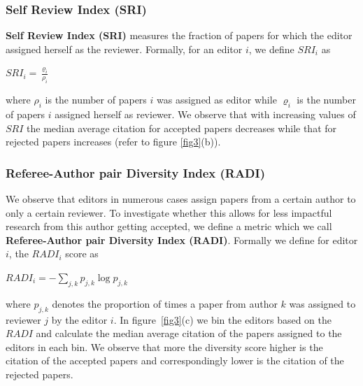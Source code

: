 \subsubsection{Self Review Index (SRI)}

{\bf Self Review Index (SRI)} measures the fraction of papers for which the editor assigned herself as the reviewer. 
Formally, for an editor $i$, we define $SRI_{i}$ as 
\begin{center}
$SRI_{i}=\frac{\varrho_{i}}{\rho_{i}}$
\end{center}
where $\rho_{i}$ is the number of papers $i$ was assigned as editor while $\varrho_{i}$ is the number of papers $i$ assigned herself as reviewer. We observe that with increasing values of $SRI$ the median average citation for accepted papers decreases while that for rejected papers increases (refer to figure \ref{fig3}(b)). 

\subsubsection{Referee-Author pair Diversity Index (RADI)}

We observe that editors in numerous cases assign papers from a certain author to only a certain reviewer. To investigate whether this allows for less impactful research from this author getting accepted, we define a metric which we call {\bf Referee-Author pair Diversity Index (RADI)}. Formally we define for editor $i$, the $RADI_{i}$ score as 

\begin{center}
$RADI_{i}=-\sum \limits_{j,k} p_{j,k} \log p_{j,k}$
\end{center}

where $p_{j,k}$ denotes the proportion of times a paper from author $k$ was assigned to reviewer $j$ by the editor $i$. In figure~\ref{fig3}(c) we bin the editors based on the $RADI$ and calculate the median average citation of the papers assigned to the editors in each bin. We observe that more the diversity score higher is the citation of the accepted papers and correspondingly lower is the citation of the rejected papers.



